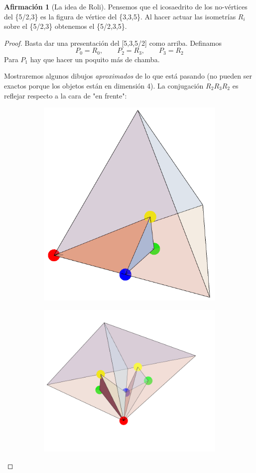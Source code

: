 \documentclass[spanish]{article}
\theoremstyle{definition}
\newtheorem*{af}{Afirmación}
\begin{document}
\begin{af}[La idea de Roli] Pensemos que el icosaedrito de los no-vértices del \{5/2,3\} es la figura de vértice del \{3,3,5\}. Al hacer actuar las isometrías $R_i$ sobre el \{5/2,3\} obtenemos el \{5/2,3,5\}.
\end{af}
\begin{proof}
	Basta dar una presentación del [5,3,5/2] como arriba. Definamos 
	\[P_0=R_0,\qquad P_2=R_3,\qquad P_3=R_2\]
	Para $P_1$ hay que hacer un poquito más de chamba.
	
	Mostraremos algunos dibujos \textit{aproximados} de lo que está pasando (no pueden ser exactos porque los objetos están en dimensión 4). La conjugación $R_2R_3R_2$ es reflejar respecto a la cara de "en frente":
	\begin{figure}[H]
		\begin{subfigure}{0.4\linewidth}
			\centering
			\includegraphics[width=0.6\linewidth]{p5}
		\end{subfigure}
		\begin{subfigure}{0.5\linewidth}
			\centering
			\includegraphics[width=0.9\linewidth]{p6}

\end{subfigure}
\end{figure}
\end{proof}
\end{document}
